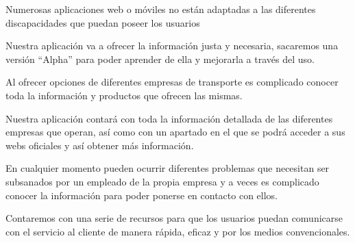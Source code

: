 \vspace{0.5cm}

\begin{problema}

      Numerosas aplicaciones web o móviles no están adaptadas a las diferentes
      discapacidades que puedan poseer los usuarios

            {\centering
                  \begin{vision}\justifying\noindent
                        Nuestra aplicación va a ofrecer la información justa y necesaria, sacaremos una versión “Alpha” para poder aprender de ella y mejorarla a través del uso.
                  \end{vision}}
\end{problema}

\vspace{0.5cm}

\begin{problema}

      Al ofrecer opciones de diferentes empresas de transporte es complicado conocer
      toda la información y productos que ofrecen las mismas.

            {\centering
                  \begin{vision}\justifying\noindent
                        Nuestra aplicación contará con toda la información detallada de las diferentes empresas que operan, así como con un apartado en el que se podrá acceder a sus webs oficiales y así obtener más información.
                  \end{vision}}
\end{problema}

\vspace{0.5cm}

\begin{problema}

      En cualquier momento pueden ocurrir diferentes problemas que necesitan ser
      subsanados por un empleado de la propia empresa y a veces es complicado conocer
      la información para poder ponerse en contacto con ellos.

            {\centering
                  \begin{vision}\justifying\noindent
                        Contaremos con una serie de recursos para que los usuarios puedan comunicarse con el servicio al cliente de manera rápida, eficaz y por los medios convencionales.
                  \end{vision}}
\end{problema}

